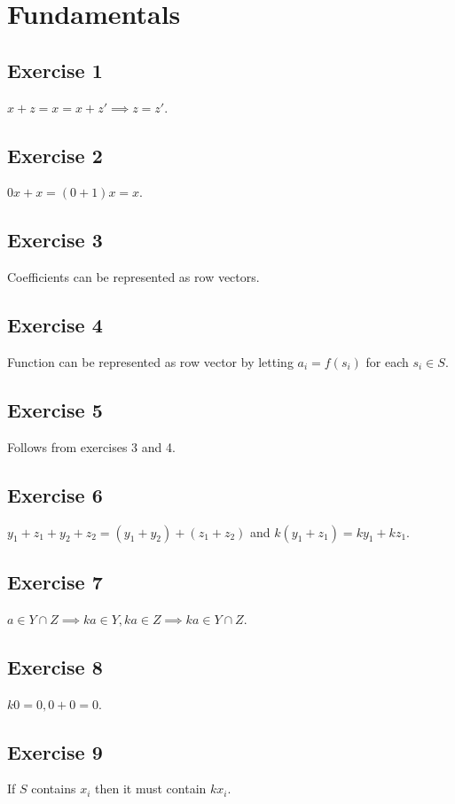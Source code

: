\section{Fundamentals}

 \subsection{Exercise 1}
 $x + z = x = x + z' \implies z = z'$.

 \subsection{Exercise 2}
 $0x + x = (0 + 1)x = x$.

 \subsection{Exercise 3}
 Coefficients can be represented as row vectors.

 \subsection{Exercise 4}
 Function can be represented as row vector by letting $a_i = f(s_i)$ for each $s_i \in S$.

 \subsection{Exercise 5}
 Follows from exercises 3 and 4.

 \subsection{Exercise 6}
 $y_1 + z_1 + y_2 + z_2 = (y_1 + y_2) + (z_1 + z_2)$ and $k(y_1 + z_1) = ky_1 + kz_1$.

 \subsection{Exercise 7}
 $a \in Y \cap Z \implies ka \in Y, ka \in Z \implies ka \in Y \cap Z$.

 \subsection{Exercise 8}
 $k0 = 0, 0 + 0 =0$.

 \subsection{Exercise 9}
 If $S$ contains $x_i$ then it must contain  $kx_i$.

